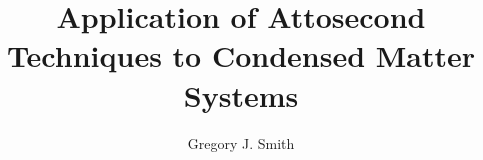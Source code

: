 \documentclass[11pt, onehalf, phd]{osudiss-2}
\title{Application of Attosecond Techniques to Condensed Matter Systems}
\author{Gregory J. Smith}
\newcommand\PrintListofAbbreviations[1]{
\phantomsection
\addcontentsline{toc}{front}{\typesetColumnHeading{#1}}
\printglossary[type=\acronymtype,title={\protect {\typesetLevelTwo{#1}}}]
}
\begin{document}
\frontmatter


\dedication{Dedicated to my family.} %


\tableofcontents

\clearpage %
\listoffigures

\clearpage  %
\listoftables 

\clearpage %

\mainmatter





\begin{appendices}
 
\end{appendices}

\backmatter


%
%
\end{document}
